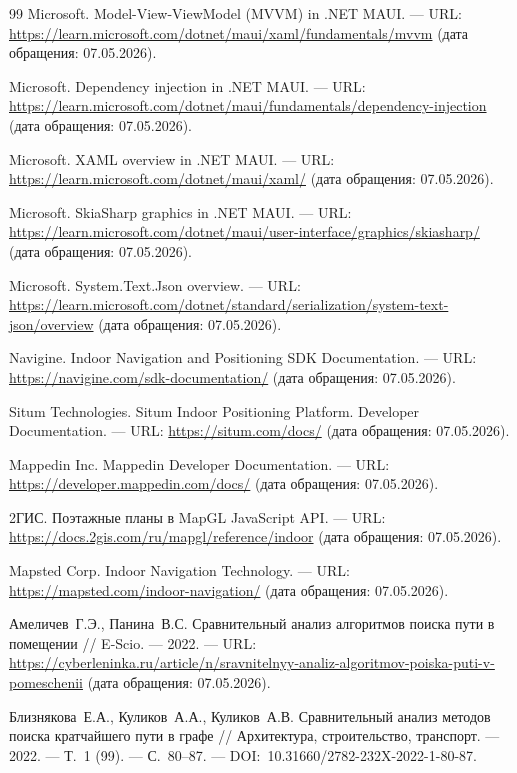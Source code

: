 \begin{thebibliography}{99}
	 Microsoft. Model-View-ViewModel (MVVM) in .NET MAUI. --- URL: \url{https://learn.microsoft.com/dotnet/maui/xaml/fundamentals/mvvm} (дата обращения: 07.05.2026).
	
	 Microsoft. Dependency injection in .NET MAUI. --- URL: \url{https://learn.microsoft.com/dotnet/maui/fundamentals/dependency-injection} (дата обращения: 07.05.2026).
	
	 Microsoft. XAML overview in .NET MAUI. --- URL: \url{https://learn.microsoft.com/dotnet/maui/xaml/} (дата обращения: 07.05.2026).
	
	 Microsoft. SkiaSharp graphics in .NET MAUI. --- URL: \url{https://learn.microsoft.com/dotnet/maui/user-interface/graphics/skiasharp/} (дата обращения: 07.05.2026).
	
	 Microsoft. System.Text.Json overview. --- URL: \url{https://learn.microsoft.com/dotnet/standard/serialization/system-text-json/overview} (дата обращения: 07.05.2026).
	
	 Navigine. Indoor Navigation and Positioning SDK Documentation. --- URL: \url{https://navigine.com/sdk-documentation/} (дата обращения: 07.05.2026).
	
	 Situm Technologies. Situm Indoor Positioning Platform. Developer Documentation. --- URL: \url{https://situm.com/docs/} (дата обращения: 07.05.2026).
	
	 Mappedin Inc. Mappedin Developer Documentation. --- URL: \url{https://developer.mappedin.com/docs/} (дата обращения: 07.05.2026).
	
	 2ГИС. Поэтажные планы в MapGL JavaScript API. --- URL: \url{https://docs.2gis.com/ru/mapgl/reference/indoor} (дата обращения: 07.05.2026).
	
	 Mapsted Corp. Indoor Navigation Technology. --- URL: \url{https://mapsted.com/indoor-navigation/} (дата обращения: 07.05.2026).
	
	
	 Амеличев~Г.Э., Панина~В.С. Сравнительный анализ алгоритмов поиска пути в помещении // E-Scio. --- 2022. --- URL: \url{https://cyberleninka.ru/article/n/sravnitelnyy-analiz-algoritmov-poiska-puti-v-pomeschenii} (дата обращения: 07.05.2026).
	
	 Близнякова~Е.А., Куликов~А.А., Куликов~А.В. Сравнительный анализ методов поиска кратчайшего пути в графе // Архитектура, строительство, транспорт. --- 2022. --- Т.~1 (99). --- С.~80--87. --- DOI:~10.31660/2782-232X-2022-1-80-87.
	

\end{thebibliography}
